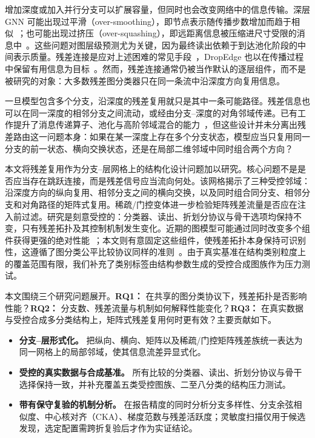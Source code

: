 \documentclass[9pt,twocolumn]{extarticle}
\begin{document}
增加深度或加入并行分支可以扩展容量，但同时也会改变网络中的信息传输。深层 GNN 可能出现过平滑（over-smoothing），即节点表示随传播步数增加而趋于相似~\cite{li2018deeper}；也可能出现过挤压（over-squashing），即远距离信息被压缩进尺寸受限的消息中~\cite{alon2020bottleneck,topping2021understanding}。这些问题对图层级预测尤为关键，因为最终读出依赖于到达池化阶段的中间表示质量。残差连接是应对上述困难的常见手段~\cite{he2016deep,bresson2017residual}，DropEdge 也以在传播过程中保留有用信息为目标~\cite{rong2019dropedge}。然而，残差连接通常仍被当作默认的逐层组件，而不是被研究的对象：大多数残差图分类器只在同一条流中沿深度方向复用信息。

一旦模型包含多个分支，沿深度的残差复用就只是其中一条可能路径。残差信息也可以在同一深度的相邻分支之间流动，或经由分支--深度的对角邻域传递。已有工作提升了消息传递算子、池化与高阶邻域混合的能力~\cite{abu2019mixhop,li2024graph}，但这些设计并未分离出残差路由这一问题本身：如果在某一深度上存在多个分支状态，模型应当只复用同一分支的前一状态、横向交换状态，还是在局部二维邻域中同时组合两个方向？

本文将残差复用作为分支--层网格上的结构化设计问题加以研究。核心问题不是是否应当存在跳跃连接，而是残差信号应当流向何处。该网格揭示了三种受控邻域：沿深度方向的纵向复用、相邻分支之间的横向交换，以及同时组合同分支、相邻分支和对角路径的矩阵式复用。稀疏/门控变体进一步检验矩阵残差流量是否应在注入前过滤。研究是刻意受控的：分类器、读出、折划分协议与骨干选项均保持不变，只有残差拓扑及其控制机制发生变化。近期的图模型可能通过同时改变多个组件获得更强的绝对性能~\cite{du2024densegnn}；本文则有意固定这些组件，使残差拓扑本身保持可识别性，这遵循了图分类公平比较协议同样的准则~\cite{errica2020fair,morris2020tudataset}。由于真实基准在结构类别粒度上的覆盖范围有限，我们补充了类别标签由结构参数生成的受控合成图族作为压力测试。

本文围绕三个研究问题展开。\textbf{RQ1：} 在共享的图分类协议下，残差拓扑是否影响性能？\textbf{RQ2：} 分支数、残差流量与机制如何解释性能变化？\textbf{RQ3：} 在真实数据与受控合成多分类结构上，矩阵式残差复用何时更有效？主要贡献如下。

\begin{itemize}
\item \textbf{分支--层形式化。} 把纵向、横向、矩阵以及稀疏/门控矩阵残差族统一表达为同一网格上的局部邻域，使其信息流差异显式化。
\item \textbf{受控的真实数据与合成基准。} 所有比较的分类器、读出、折划分协议与骨干选择保持一致，并补充覆盖五类受控图族、二至八分类的结构压力测试。
\item \textbf{带有保守复验的机制分析。} 在报告精度的同时分析分支多样性、分支余弦相似度、中心核对齐（CKA）、梯度范数与残差活跃度；灵敏度扫描仅用于候选发现，选定配置需跨折复验后才作为实证结论。
\end{itemize}
\end{document}
